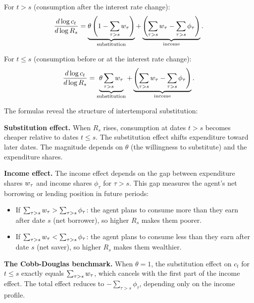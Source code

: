 For $t > s$ (consumption after the interest rate change):
\begin{equation}
\frac{d \log c_t}{d \log R_s} = \underbrace{\theta \left( 1 - \sum_{\tau > s} w_{\tau} \right)}_{\text{substitution}} + \underbrace{\left( \sum_{\tau > s} w_{\tau} - \sum_{\tau > s} \phi_{\tau} \right)}_{\text{income}}.
\label{eq:cross-elasticity-after}
\end{equation}

For $t \leq s$ (consumption before or at the interest rate change):
\begin{equation}
\frac{d \log c_t}{d \log R_s} = \underbrace{\theta \sum_{\tau > s} w_{\tau}}_{\text{substitution}} + \underbrace{\left( \sum_{\tau > s} w_{\tau} - \sum_{\tau > s} \phi_{\tau} \right)}_{\text{income}}.
\label{eq:cross-elasticity-before}
\end{equation}

\begin{calloutimportant}
The formulas reveal the structure of intertemporal substitution:

\medskip
\textbf{Substitution effect.} When $R_s$ rises, consumption at dates $t > s$ becomes cheaper relative to dates $t \leq s$. The substitution effect shifts expenditure toward later dates. The magnitude depends on $\theta$ (the willingness to substitute) and the expenditure shares.

\medskip
\textbf{Income effect.} The income effect depends on the gap between expenditure shares $w_{\tau}$ and income shares $\phi_{\tau}$ for $\tau > s$. This gap measures the agent's net borrowing or lending position in future periods:
\begin{itemize}[nosep]
\item If $\sum_{\tau > s} w_{\tau} > \sum_{\tau > s} \phi_{\tau}$: the agent plans to consume more than they earn after date $s$ (net borrower), so higher $R_s$ makes them poorer.
\item If $\sum_{\tau > s} w_{\tau} < \sum_{\tau > s} \phi_{\tau}$: the agent plans to consume less than they earn after date $s$ (net saver), so higher $R_s$ makes them wealthier.
\end{itemize}

\medskip
\textbf{The Cobb-Douglas benchmark.} When $\theta = 1$, the substitution effect on $c_t$ for $t \leq s$ exactly equals $\sum_{\tau > s} w_{\tau}$, which cancels with the first part of the income effect. The total effect reduces to $-\sum_{\tau > s} \phi_{\tau}$, depending only on the income profile.
\end{calloutimportant}

